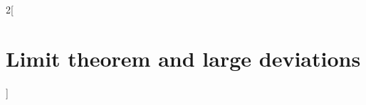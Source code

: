 \documentclass[../../../main_math.tex]{subfiles}
\begin{document}
\begin{multicols}{2}[\section{Limit theorem and large deviations}]

\end{multicols}
\end{document}

